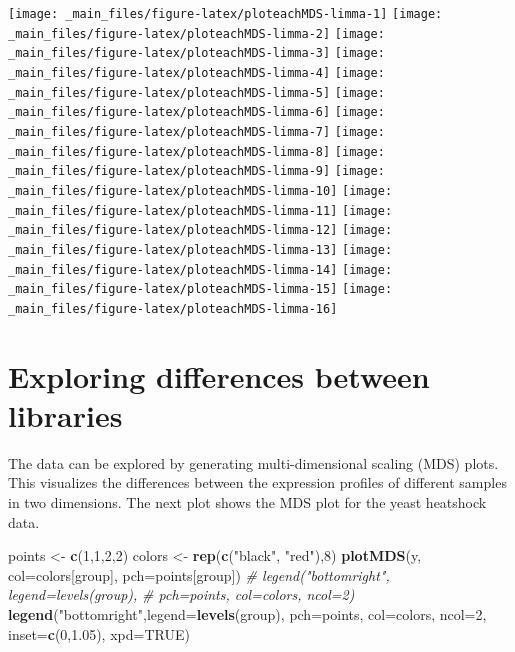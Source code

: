 \documentclass[
]{book}
\newenvironment{Shaded}{\begin{snugshade}}{\end{snugshade}}
\newcommand{\AttributeTok}[1]{\textcolor[rgb]{0.13,0.29,0.53}{#1}}
\newcommand{\CommentTok}[1]{\textcolor[rgb]{0.56,0.35,0.01}{\textit{#1}}}
\newcommand{\ConstantTok}[1]{\textcolor[rgb]{0.56,0.35,0.01}{#1}}
\newcommand{\DecValTok}[1]{\textcolor[rgb]{0.00,0.00,0.81}{#1}}
\newcommand{\FloatTok}[1]{\textcolor[rgb]{0.00,0.00,0.81}{#1}}
\newcommand{\FunctionTok}[1]{\textcolor[rgb]{0.13,0.29,0.53}{\textbf{#1}}}
\newcommand{\NormalTok}[1]{#1}
\newcommand{\OtherTok}[1]{\textcolor[rgb]{0.56,0.35,0.01}{#1}}
\newcommand{\StringTok}[1]{\textcolor[rgb]{0.31,0.60,0.02}{#1}}
\begin{document}
\texttt{[image: \_main\_files/figure-latex/ploteachMDS-limma-1]} \texttt{[image: \_main\_files/figure-latex/ploteachMDS-limma-2]} \texttt{[image: \_main\_files/figure-latex/ploteachMDS-limma-3]} \texttt{[image: \_main\_files/figure-latex/ploteachMDS-limma-4]} \texttt{[image: \_main\_files/figure-latex/ploteachMDS-limma-5]} \texttt{[image: \_main\_files/figure-latex/ploteachMDS-limma-6]} \texttt{[image: \_main\_files/figure-latex/ploteachMDS-limma-7]} \texttt{[image: \_main\_files/figure-latex/ploteachMDS-limma-8]} \texttt{[image: \_main\_files/figure-latex/ploteachMDS-limma-9]} \texttt{[image: \_main\_files/figure-latex/ploteachMDS-limma-10]} \texttt{[image: \_main\_files/figure-latex/ploteachMDS-limma-11]} \texttt{[image: \_main\_files/figure-latex/ploteachMDS-limma-12]} \texttt{[image: \_main\_files/figure-latex/ploteachMDS-limma-13]} \texttt{[image: \_main\_files/figure-latex/ploteachMDS-limma-14]} \texttt{[image: \_main\_files/figure-latex/ploteachMDS-limma-15]} \texttt{[image: \_main\_files/figure-latex/ploteachMDS-limma-16]}

\hypertarget{exploring-differences-between-libraries-1}{%
\section{Exploring differences between libraries}\label{exploring-differences-between-libraries-1}}

The data can be explored by generating multi-dimensional scaling (MDS)
plots. This visualizes the differences between the expression profiles
of different samples in two dimensions. The next plot shows the MDS plot
for the yeast heatshock data.

\begin{Shaded}
\begin{Highlighting}[]
\NormalTok{points }\OtherTok{\textless{}{-}} \FunctionTok{c}\NormalTok{(}\DecValTok{1}\NormalTok{,}\DecValTok{1}\NormalTok{,}\DecValTok{2}\NormalTok{,}\DecValTok{2}\NormalTok{)}
\NormalTok{colors }\OtherTok{\textless{}{-}} \FunctionTok{rep}\NormalTok{(}\FunctionTok{c}\NormalTok{(}\StringTok{"black"}\NormalTok{, }\StringTok{"red"}\NormalTok{),}\DecValTok{8}\NormalTok{)}
\FunctionTok{plotMDS}\NormalTok{(y, }\AttributeTok{col=}\NormalTok{colors[group], }\AttributeTok{pch=}\NormalTok{points[group])}
\CommentTok{\# legend("bottomright", legend=levels(group),}
     \CommentTok{\# pch=points, col=colors, ncol=2)}
\FunctionTok{legend}\NormalTok{(}\StringTok{"bottomright"}\NormalTok{,}\AttributeTok{legend=}\FunctionTok{levels}\NormalTok{(group),}
       \AttributeTok{pch=}\NormalTok{points, }\AttributeTok{col=}\NormalTok{colors, }\AttributeTok{ncol=}\DecValTok{2}\NormalTok{,}
       \AttributeTok{inset=}\FunctionTok{c}\NormalTok{(}\DecValTok{0}\NormalTok{,}\FloatTok{1.05}\NormalTok{), }\AttributeTok{xpd=}\ConstantTok{TRUE}\NormalTok{)}
\end{Highlighting}
\end{Shaded}
\end{document}
